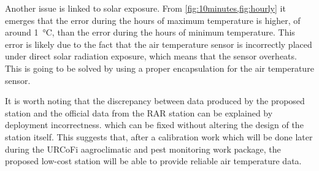 \documentclass[conference]{IEEEtran}
\begin{document}
Another issue is linked to solar exposure.
From \cref{fig:10minutes,fig:hourly} it emerges that the error during the hours of maximum temperature is higher, of around \SI{1}{\celsius}, than the error during the hours of minimum temperature. 
This error is likely due to the fact that the air temperature sensor is incorrectly placed under direct solar radiation exposure, which means that the sensor overheats. 
This is going to be solved by using a proper encapsulation for the air temperature sensor.

It is worth noting that the discrepancy between data produced by the proposed station and the official data from the RAR station can be explained by deployment incorrectness. which can be fixed without altering the design of the station itself. This suggests that, after a calibration work which will be done later during the URCoFi aagroclimatic and pest monitoring work package, the proposed low-cost station will be able to provide reliable air temperature data.
\end{document}
